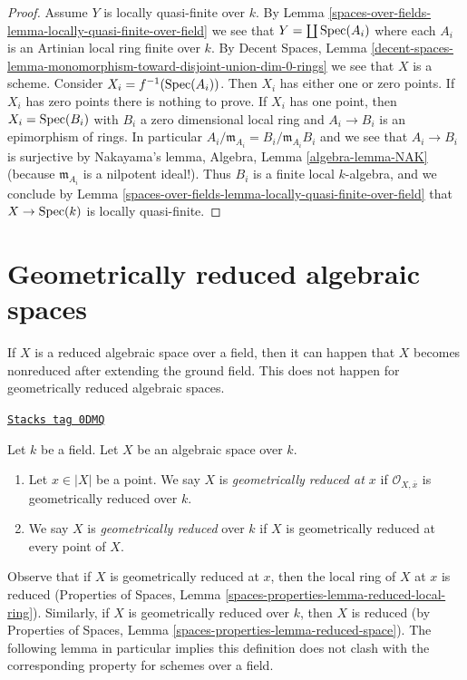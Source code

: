 \begin{proof}
Assume $Y$ is locally quasi-finite over $k$. By
Lemma \ref{spaces-over-fields-lemma-locally-quasi-finite-over-field}
we see that $Y = \coprod \operatorname{Spec}(A_i)$ where each $A_i$ is an
Artinian local ring finite over $k$. By
Decent Spaces, Lemma
\ref{decent-spaces-lemma-monomorphism-toward-disjoint-union-dim-0-rings}
we see that $X$ is a scheme. Consider $X_i = f^{-1}(\operatorname{Spec}(A_i))$.
Then $X_i$ has either one or zero points. If $X_i$ has zero points there
is nothing to prove. If $X_i$ has one point, then
$X_i = \operatorname{Spec}(B_i)$ with $B_i$ a zero dimensional local ring
and $A_i \to B_i$ is an epimorphism of rings. In particular
$A_i/\mathfrak m_{A_i} = B_i/\mathfrak m_{A_i}B_i$ and we see that
$A_i \to B_i$ is surjective by Nakayama's lemma,
Algebra, Lemma \ref{algebra-lemma-NAK}
(because $\mathfrak m_{A_i}$ is a nilpotent ideal!).
Thus $B_i$ is a finite local $k$-algebra, and we conclude by
Lemma \ref{spaces-over-fields-lemma-locally-quasi-finite-over-field}
that $X \to \operatorname{Spec}(k)$ is locally quasi-finite.
\end{proof}

\section{Geometrically reduced algebraic spaces}
\label{spaces-over-fields-section-geometrically-reduced}
If $X$ is a reduced algebraic space over a field, then it can happen that $X$
becomes nonreduced after extending the ground field. This does not happen
for geometrically reduced algebraic spaces.

\begin{definition}
\label{spaces-over-fields-definition-geometrically-reduced}
\href{https://stacks.math.columbia.edu/tag/0DMQ}{\texttt{Stacks tag 0DMQ}}

Let $k$ be a field.
Let $X$ be an algebraic space over $k$.
\begin{enumerate}
\item Let $x \in |X|$ be a point. We say $X$ is
{\it geometrically reduced at $x$} if $\mathcal{O}_{X, \overline{x}}$
is geometrically reduced over $k$.
\item We say $X$ is {\it geometrically reduced} over $k$
if $X$ is geometrically reduced at every point of $X$.
\end{enumerate}
\end{definition}

Observe that if $X$ is geometrically reduced at $x$, then the local
ring of $X$ at $x$ is reduced (Properties of Spaces, Lemma
\ref{spaces-properties-lemma-reduced-local-ring}).
Similarly, if $X$ is geometrically reduced over $k$, then $X$ is reduced
(by Properties of Spaces, Lemma \ref{spaces-properties-lemma-reduced-space}).
The following lemma in particular implies this definition does not clash
with the corresponding property for schemes over a field.

